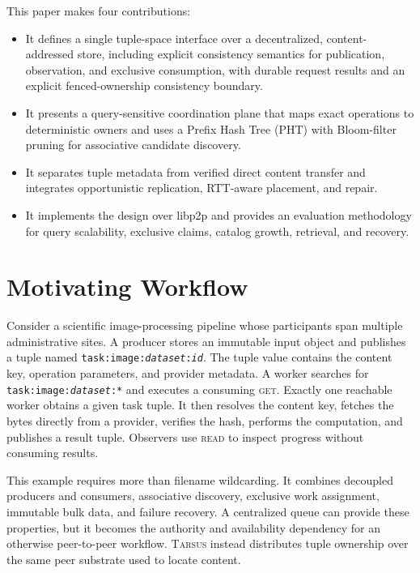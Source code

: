 \documentclass[conference]{IEEEtran}
\newcommand{\system}{\textsc{Tarsus}\xspace}
\newcommand{\readop}{\textsc{read}\xspace}
\newcommand{\getop}{\textsc{get}\xspace}
\begin{document}
This paper makes four contributions:
\begin{itemize}
    \item It defines a single tuple-space interface over a decentralized,
    content-addressed store, including explicit consistency semantics for
    publication, observation, and exclusive consumption, with durable request
    results and an explicit fenced-ownership consistency boundary.
    \item It presents a query-sensitive coordination plane that maps exact
    operations to deterministic owners and uses a Prefix Hash Tree (PHT) with
    Bloom-filter pruning for associative candidate discovery.
    \item It separates tuple metadata from verified direct content transfer and
    integrates opportunistic replication, RTT-aware placement, and repair.
    \item It implements the design over libp2p and provides an evaluation
    methodology for query scalability, exclusive claims, catalog growth,
    retrieval, and recovery.
\end{itemize}

\section{Motivating Workflow}
\label{sec:workflow}

Consider a scientific image-processing pipeline whose participants span
multiple administrative sites. A producer stores an immutable input object and
publishes a tuple named
\texttt{task:image:\emph{dataset}:\emph{id}}. The tuple value contains the
content key, operation parameters, and provider metadata. A worker searches for
\texttt{task:image:\emph{dataset}:*} and executes a consuming \getop. Exactly
one reachable worker obtains a given task tuple. It then resolves the content
key, fetches the bytes directly from a provider, verifies the hash, performs
the computation, and publishes a result tuple. Observers use \readop to inspect
progress without consuming results.

This example requires more than filename wildcarding. It combines decoupled
producers and consumers, associative discovery, exclusive work assignment,
immutable bulk data, and failure recovery. A centralized queue can provide
these properties, but it becomes the authority and availability dependency for
an otherwise peer-to-peer workflow. \system instead distributes tuple
ownership over the same peer substrate used to locate content.
\end{document}
